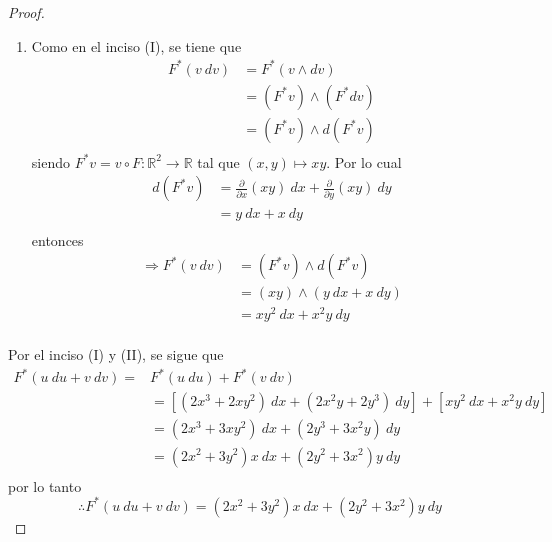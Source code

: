 \documentclass[12pt]{report}
\theoremstyle{largebreak}
\newcommand\cf[3]{\ensuremath{#1:#2\rightarrow#3}}
\begin{document}
\begin{proof}
\begin{enumerate}
            \item Como en el inciso (I), se tiene que
            \begin{equation*}
                \begin{split}
                    F^*(v\: dv)&=F^*(v\wedge dv)\\
                    &=(F^*v)\wedge (F^*dv)\\
                    &=(F^*v)\wedge d(F^*v)\\
                \end{split}
            \end{equation*}
            siendo $F^*v=\cf{v\circ F}{\mathbb{R}^2}{\mathbb{R}}$ tal que $(x,y)\mapsto xy$. Por lo cual
            \begin{equation*}
                \begin{split}
                    d(F^*v)&=\frac{\partial}{\partial x}(xy)\:dx+\frac{\partial}{\partial y}(xy)\: dy\\
                    &=y\:dx+x\: dy\\
                \end{split}
            \end{equation*}
            entonces
            \begin{equation*}
                \begin{split}
                    \Rightarrow F^*(v\:dv)&=(F^*v)\wedge d(F^*v)\\
                    &=(xy)\wedge (y\:dx+x\: dy)\\
                    &=xy^2\:dx+x^2y\: dy\\
                \end{split}
            \end{equation*}
        \end{enumerate}
        Por el inciso (I) y (II), se sigue que
        \begin{equation*}
            \begin{split}
                F^*(u\:du+v\:dv)=&F^*(u\:du)+F^*(v\:dv)\\
                &=\left[(2x^3+2xy^2)\:dx+(2x^2y+2y^3)\:dy\right]+\left[xy^2\:dx+x^2y\: dy\right]\\
                &=(2x^3+3xy^2)\:dx+(2y^3+3x^2y)\:dy\\
                &=(2x^2+3y^2)x\:dx+(2y^2+3x^2)y\:dy\\
            \end{split}
        \end{equation*}
        por lo tanto
        \begin{equation*}
            \therefore F^*(u\:du+v\:dv)=(2x^2+3y^2)x\:dx+(2y^2+3x^2)y\:dy
        \end{equation*}
    \end{proof}
\end{document}
